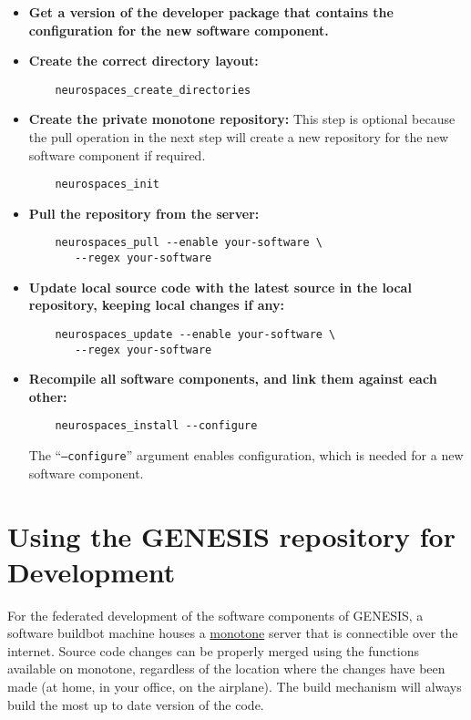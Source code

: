 \documentclass[12pt]{article}
\begin{document}
\begin{itemize}

\item {\bf Get a version of the developer package that contains the
    configuration for the new software component.}
  
\item {\bf Create the correct directory layout:}
\begin{verbatim}
	neurospaces_create_directories
\end{verbatim}

\item {\bf Create the private monotone repository:} This step is
  optional because the pull operation in the next step will create a
  new repository for the new software component if required.
\begin{verbatim}
	neurospaces_init
\end{verbatim}

\item {\bf Pull the repository from the server:}
\begin{verbatim}
	neurospaces_pull --enable your-software \
	   --regex your-software
\end{verbatim}
  
\item {\bf Update local source code with the latest source in the
    local repository, keeping local changes if any:}
\begin{verbatim}
	neurospaces_update --enable your-software \
	   --regex your-software
\end{verbatim}
  
\item {\bf Recompile all software components, and link them against
    each other:}
\begin{verbatim}
	neurospaces_install --configure
\end{verbatim}
  The ``{\tt --configure}'' argument enables configuration, which is
  needed for a new software component.
\end{itemize}

\section*{Using the GENESIS repository for Development}

For the federated development of the software components of GENESIS, a software buildbot machine houses a \href{http://monotone.ca/}{monotone} server that is connectible over the internet. Source code changes can be properly merged using the functions available on monotone, regardless of the location where the changes have been made (at home, in your office, on the airplane). The build mechanism will always build the most up to date version of the code.
\end{document}
